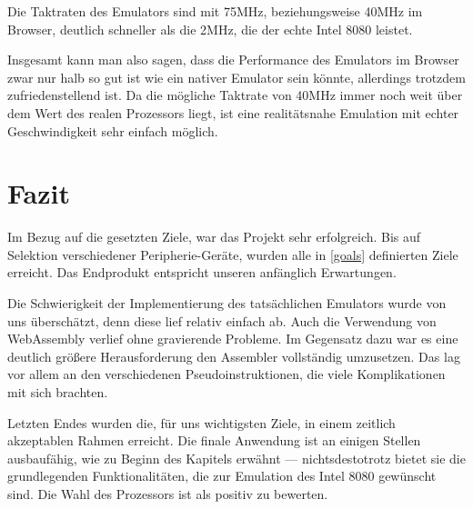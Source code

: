 Die Taktraten des Emulators sind mit 75MHz, beziehungsweise 40MHz im Browser, deutlich schneller als die 2MHz, die der echte Intel 8080 leistet.

Insgesamt kann man also sagen, dass die Performance des Emulators im Browser zwar nur halb so gut ist wie ein nativer Emulator sein könnte, allerdings trotzdem zufriedenstellend ist. Da die mögliche Taktrate von 40MHz immer noch weit über dem Wert des realen Prozessors liegt, ist eine realitätsnahe Emulation mit echter Geschwindigkeit sehr einfach möglich.

\section{Fazit}

Im Bezug auf die gesetzten Ziele, war das Projekt sehr erfolgreich. Bis auf Selektion verschiedener Peripherie-Geräte, wurden alle in \cref{goals} definierten Ziele erreicht. Das Endprodukt entspricht unseren anfänglich Erwartungen.

Die Schwierigkeit der Implementierung des tatsächlichen Emulators wurde von uns überschätzt, denn diese lief relativ einfach ab. Auch die Verwendung von WebAssembly verlief ohne gravierende Probleme. Im Gegensatz dazu war es eine deutlich größere Herausforderung den Assembler vollständig umzusetzen. Das lag vor allem an den verschiedenen Pseudoinstruktionen, die viele Komplikationen mit sich brachten.

Letzten Endes wurden die, für uns wichtigsten Ziele, in einem zeitlich akzeptablen Rahmen erreicht. Die finale Anwendung ist an einigen Stellen ausbaufähig, wie zu Beginn des Kapitels erwähnt --- nichtsdestotrotz bietet sie die grundlegenden Funktionalitäten, die zur Emulation des Intel 8080 gewünscht sind. Die Wahl des Prozessors ist als positiv zu bewerten.
